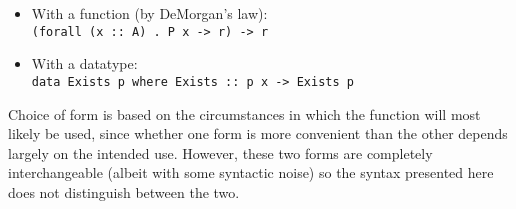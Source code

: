 \begin{itemize}
    \item With a function (by DeMorgan's law): \\ \texttt{(forall (x :: A) . P 
    x -> r) -> r}
    \item With a datatype: \\ \texttt{data Exists p where Exists :: p x -> 
    Exists p}
\end{itemize} 

Choice of form is based on the circumstances in which the function
will most likely be used, since whether one form is more convenient than the
other depends largely on the intended use. However, these two forms are
completely interchangeable (albeit with some syntactic noise) so the syntax
presented here does not distinguish between the two. 


